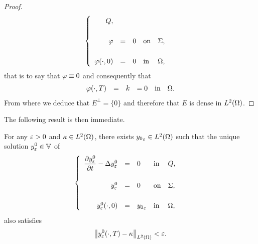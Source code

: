 \begin{proof}
\begin{equation*}
\begin{cases}
\begin{array}{rclll}
                Q,\\
                \\
                \varphi & = & 0 & \text{on} & \Sigma,\\
                \\
                \varphi\!\left({\cdot,0}\right) & = & 0 & \text{in} &
                \Omega,
            \end{array}
        \end{cases}
    \end{equation*}
    that is to say that $\varphi\equiv 0$ and consequently that
    \begin{equation*}
        \begin{array}{rclcll}
            \varphi\!\left({\cdot,T}\right) & = & k & = 0 & \text{in} &
            \Omega.
        \end{array}
    \end{equation*}
    From where we deduce that $E^{\perp} = \{0\}$ and therefore that $E$ is
    dense in $L^{2}\!\left({\Omega}\right)$.
\end{proof}

The following result is then immediate.

\begin{corollaire}\label{coro:controllability-result-2}%
    For any $\varepsilon > 0$ and $\kappa\in L^{2}\!\left({\Omega}\right)$, there exists
    ${y_{0}}_{\varepsilon}\in L^{2}\!\left({\Omega}\right)$ such that the unique solution
    $\displaystyle y_{\varepsilon}^{0}\in \mathbb{V}$ of
    \begin{equation}\label{eq:controllability-result-3}
        \begin{cases}\displaystyle
            \begin{array}{rclll}
                \dfrac{\partial{}y_{\varepsilon}^{0}}{\partial{}t} - \Delta y_{\varepsilon}^{0} & = & 0 &
                \text{in} & Q,\\
                \\
                y_{\varepsilon}^{0} & = & 0 & \text{on} & \Sigma,\\
                \\
                y_{\varepsilon}^{0}\!\left({\cdot,0}\right) & = & {y_{0}}_{\varepsilon}
                & \text{in} & \Omega,
            \end{array}
        \end{cases}
    \end{equation}
    also satisfies
    \begin{equation}\label{eq:controllability-result-4}
        {\left\|{y_{\varepsilon}^{0}\!\left({\cdot,T}\right) - \kappa }\right\|}_{L^{2}\left({\Omega}\right)} < \varepsilon.
    \end{equation}
\end{corollaire}

